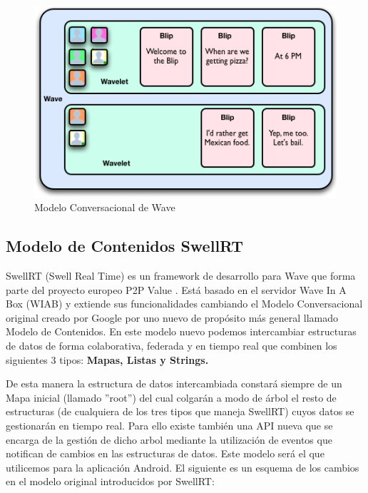     \begin{figure}[H]
	  \centering
	    \includegraphics[keepaspectratio, scale=0.7]{Media/Captures/waveEntities.png}
	  \caption{Modelo Conversacional de Wave}
	  \label{fig:wave_model}
	\end{figure}
	
	\subsection{Modelo de Contenidos SwellRT}\label{sec:swellRTModel}
	
	SwellRT \cite{ref:swellRT_github} (Swell Real Time) es un framework de desarrollo para Wave que forma parte del proyecto europeo P2P Value \cite{ref:p2pvalue}. Está basado en el servidor Wave In A Box \cite{ref:wave_in_a_box} (WIAB) y extiende sus funcionalidades cambiando el Modelo Conversacional original creado por Google por uno nuevo de propósito más general llamado Modelo de Contenidos. En este modelo nuevo podemos intercambiar estructuras de datos de forma colaborativa, federada y en tiempo real que combinen los siguientes 3 tipos: \textbf{Mapas, Listas y Strings.}
	
	De esta manera la estructura de datos intercambiada constará siempre de un Mapa inicial (llamado ''root'') del cual colgarán a modo de árbol el resto de estructuras (de cualquiera de los tres tipos que maneja SwellRT) cuyos datos se gestionarán en tiempo real. Para ello existe también una API nueva que se encarga de la gestión de dicho arbol mediante la utilización de eventos que notifican de cambios en las estructuras de datos. Este modelo será el que utilicemos para la aplicación Android. El siguiente es un esquema de los cambios en el modelo original introducidos por SwellRT:
	
